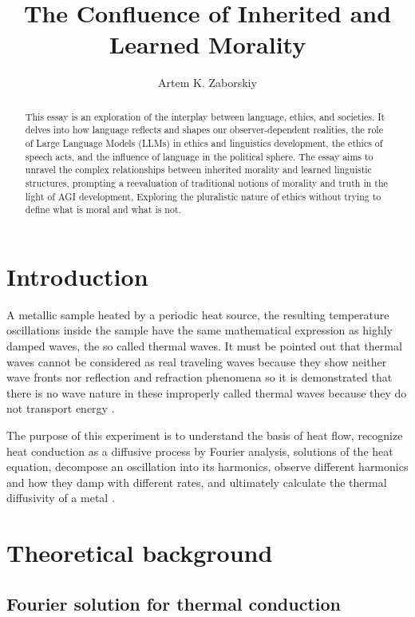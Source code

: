\documentclass[12pt,a4]{article}
\begin{document}
\title{The Confluence of Inherited and Learned Morality}


\author{Artem K. Zaborskiy}
\maketitle

\begin{abstract}
This essay is an exploration of the interplay between language, ethics, and societies. It delves into how language reflects and shapes our observer-dependent realities, the role of Large Language Models (LLMs) in ethics and linguistics development, the ethics of speech acts, and the influence of language in the political sphere. The essay aims to unravel the complex relationships between inherited morality and learned linguistic structures, prompting a reevaluation of traditional notions of morality and truth in the light of AGI development, Exploring the pluralistic nature of ethics without trying to define what is moral and what is not. 
\end{abstract}

\section{Introduction}
A metallic sample heated by a periodic heat source, the resulting temperature oscillations inside the sample have the same mathematical expression as highly damped waves, the so called thermal waves. It must be pointed out that thermal waves cannot be considered as real traveling waves because they show neither wave fronts nor reflection and refraction phenomena so it is demonstrated that there is no wave nature in these improperly called thermal waves because they do not transport energy \cite{1}.\par 
The purpose of this experiment is to understand the basis of heat flow, recognize heat conduction as a diffusive process by Fourier analysis, solutions of the heat equation, decompose an oscillation into its harmonics, observe different harmonics and how they damp with different rates, and ultimately calculate the thermal diffusivity of a metal \cite{2}. %

\section{Theoretical background}
\subsection{Fourier solution for thermal conduction}
\end{document}
